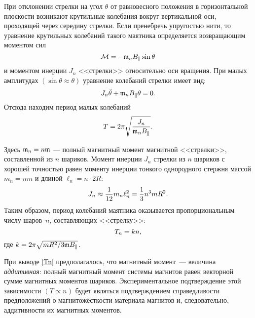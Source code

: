 При отклонении стрелки на угол $\theta$ от равновесного положения 
в горизонтальной плоскости возникают крутильные колебания вокруг 
вертикальной оси, проходящей через середину стрелки. Если пренебречь 
упругостью нити, то уравнение крутильных колебаний такого маятника
определяется возвращающим моментом сил 
\[
\mathcal{M}=-\mathfrak{m}_n B_{\parallel}\sin \theta
\]
и моментом инерции $J_n$ <<стрелки>> относительно оси вращения. 
При малых амплитудах  $(\sin \theta \approx \theta)$ уравнение колебаний
стрелки имеет вид: 
\begin{equation*}
J_n \ddot{\theta} + \mathfrak{m}_n B_{\parallel} \theta = 0.
\end{equation*}
Отсюда находим период малых колебаний
\begin{equation}
T=2\pi \sqrt{\frac{J_n}{\mathfrak{m}_n B_{\parallel}}}.
\end{equation}

Здесь $\mathfrak{m}_n = n \mathfrak{m}$ --- полный магнитный момент магнитной <<стрелки>>, 
составленной из $n$ шариков.
Момент инерции $J_n$ стрелки из $n$ шариков с хорошей точностью равен 
моменту инерции тонкого однородного стержня массой $m_n = nm$
и длиной $\ell_n = n \cdot 2R$:
\begin{equation}\eqmark{Jn}
J_n \approx \frac{1}{12} m_n \ell_n^2 = \frac{1}{3}n^3 m R^2.
\end{equation}
Таким образом, период колебаний маятника оказывается
пропорциональным числу шаров~$n$, составляющих <<стрелку>>:
\begin{equation}\eqmark{Tn}
T_n=k n,
\end{equation}
где $k= 2\pi \sqrt{mR^2/3\mathfrak{m} B_{\parallel}}$.

При выводе \eqref{Tn} предполагалось, что магнитный момент~--- величина
\emph{аддитивная}: полный магнитный момент системы магнитов равен
векторной сумме магнитных моментов шариков.
Экспериментальное подтверждение этой зависимости $(T \propto n)$ будет являться
подтверждением справедливости предположений о магнитожёсткости материала
магнитов и, следовательно, аддитивности их магнитных моментов.


